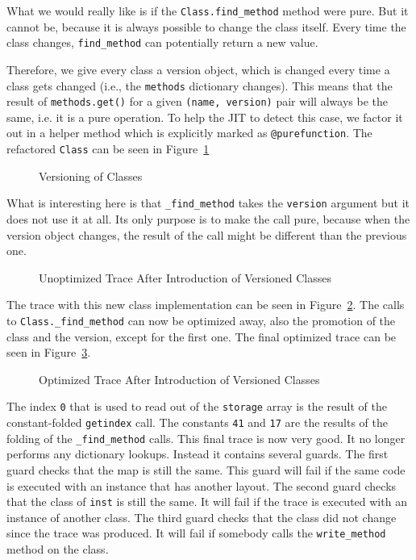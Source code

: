 \documentclass{sigplanconf}
\begin{document}
What we would really like is if the \texttt{Class.find\_method} method were pure.
But it cannot be, because it is always possible to change the class itself.
Every time the class changes, \texttt{find\_method} can potentially return a
new value.

Therefore, we give every class a version object, which is changed every time a
class gets changed (i.e., the \texttt{methods} dictionary changes).
This means that the result of \texttt{methods.get()} for a given \texttt{(name,
version)} pair will always be the same, i.e. it is a pure operation.  To help
the JIT to detect this case, we factor it out in a helper method which is
explicitly marked as \texttt{@purefunction}. The refactored \texttt{Class} can
be seen in Figure~\ref{fig:version}

\begin{figure}

\caption{Versioning of Classes}
\label{fig:version}
\end{figure}

What is interesting here is that \texttt{\_find\_method} takes the \texttt{version}
argument but it does not use it at all. Its only purpose is to make the call
pure, because when the version object changes, the result of the call might be
different than the previous one.

\begin{figure}

\caption{Unoptimized Trace After Introduction of Versioned Classes}
\label{fig:trace4}
\end{figure}

The trace with this new class implementation can be seen in
Figure~\ref{fig:trace4}.
The calls to \texttt{Class.\_find\_method} can now be optimized away, also the
promotion of the class and the version, except for the first one. The final
optimized trace can be seen in Figure~\ref{fig:trace5}.

\begin{figure}

\caption{Optimized Trace After Introduction of Versioned Classes}
\label{fig:trace5}
\end{figure}

The index \texttt{0} that is used to read out of the \texttt{storage} array is the result
of the constant-folded \texttt{getindex} call.
The constants \texttt{41} and \texttt{17} are the results of the folding of the
\texttt{\_find\_method} calls. This final trace is now very good. It no longer performs any
dictionary lookups. Instead it contains several guards. The first guard
checks that the map is still the same. This guard will fail if the same
code is executed with an instance that has another layout. The second guard
checks that the class of \texttt{inst} is still the same. It will fail if the trace is
executed with an instance of another class. The third guard checks that the
class did not change since the trace was produced. It will fail if somebody
calls the \texttt{write\_method} method on the class.
\end{document}
